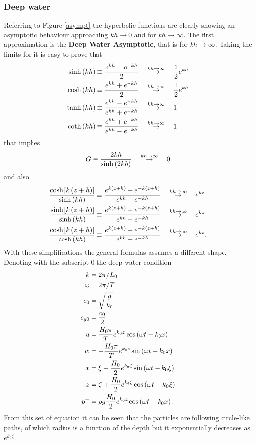 \subsubsection*{Deep water}
Referring to Figure \ref{asympt} the hyperbolic functions are clearly showing an asymptotic behaviour approaching $kh\rightarrow0$ and for $kh\rightarrow\infty$. The first approximation is the \textbf{Deep Water Asymptotic}, that is for $kh\rightarrow\infty$. Taking the limits for it is easy to prove that
\begin{align*}
\sinh\left( kh \right)&\equiv\dfrac{e^{kh}-e^{-kh}}{2}\quad\overset{kh\rightarrow\infty}{\rightarrow}\quad\dfrac{1}{2}e^{kh}\\
\cosh\left( kh \right)&\equiv\dfrac{e^{kh}+e^{-kh}}{2}\quad\overset{kh\rightarrow\infty}{\rightarrow}\quad\dfrac{1}{2}e^{kh}\\
\tanh\left( kh \right)&\equiv\dfrac{e^{kh}-e^{-kh}}{e^{kh}+e^{-kh}}\quad\overset{kh\rightarrow\infty}{\rightarrow}\quad 1\\
\coth\left( kh \right)&\equiv\dfrac{e^{kh}+e^{-kh}}{e^{kh}-e^{-kh}}\quad\overset{kh\rightarrow\infty}{\rightarrow}\quad 1
\end{align*}
that implies 
\begin{equation*}
G\equiv \dfrac{2kh}{\sinh\left( 2kh \right)}\quad\overset{kh\rightarrow\infty}{\rightarrow}\quad 0
\end{equation*}
and also
\begin{align*}
\dfrac{\cosh\left[ k\left( z+h \right) \right]}{\sinh\left( kh \right)}&\equiv \dfrac{e^{k\left( z+h \right)}+e^{-k\left( z+h \right)}}{e^{kh}-e^{-kh}}\quad\overset{kh\rightarrow\infty}{\rightarrow}\quad e^{kz}\\
\dfrac{\sinh\left[ k\left( z+h \right) \right]}{\sinh\left( kh \right)}&\equiv \dfrac{e^{k\left( z+h \right)}-e^{-k\left( z+h \right)}}{e^{kh}-e^{-kh}}\quad\overset{kh\rightarrow\infty}{\rightarrow}\quad e^{kz}\\
\dfrac{\cosh\left[ k\left( z+h \right) \right]}{\cosh\left( kh \right)}&\equiv \dfrac{e^{k\left( z+h \right)}+e^{-k\left( z+h \right)}}{e^{kh}+e^{-kh}}\quad\overset{kh\rightarrow\infty}{\rightarrow}\quad e^{kz}.
\end{align*}
With these simplifications the general formulas assumes a different shape. Denoting with the subscript $0$ the deep water condition
\begin{align}
k&=2\pi/L_{0}\\
\omega&=2\pi/T\\
c_{0}&=\sqrt{\dfrac{g}{k_{0}}}\\
c_{g0}&=\dfrac{c_{0}}{2}\\
u&=\dfrac{H_{0}\pi}{T}e^{k_{0}z}\cos\left( \omega t -k_{0}x \right)\\
w&=-\dfrac{H_{0}\pi}{T}e^{k_{0}z}\sin\left( \omega t -k_{0}x \right)\\
x&=\xi + \dfrac{H_{0}}{2}e^{k_{0}\zeta}\sin\left( \omega t-k_{0}\xi \right)\\
z&=\zeta+\dfrac{H_{0}}{2}e^{k_{0}\zeta}\cos\left( \omega t-k_{0}\xi \right)\\
p^{+}&=\rho g\dfrac{H_{0}}{2}e^{k_{0}z}\cos\left( \omega t -k_{0}x \right).
\end{align}
From this set of equation it can be seen that the particles are following circle-like paths, of which radius is a function of the depth but it exponentially decreases as $e^{k_{0}\zeta}$. 
